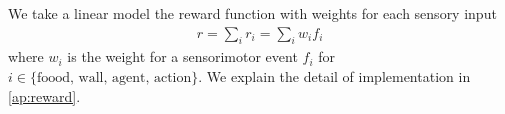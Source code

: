 We take a linear model the reward function with weights for each sensory input
\begin{align}
  r = \sum_i r_i = \sum_i w_i f_i
  \label{eq:reward}
\end{align}
where $w_i$ is the weight for a sensorimotor event $f_i$ for $i\in{\mbox{\{foood, wall, agent,  action\}}}$.
We explain the detail of implementation in \cref{ap:reward}.

